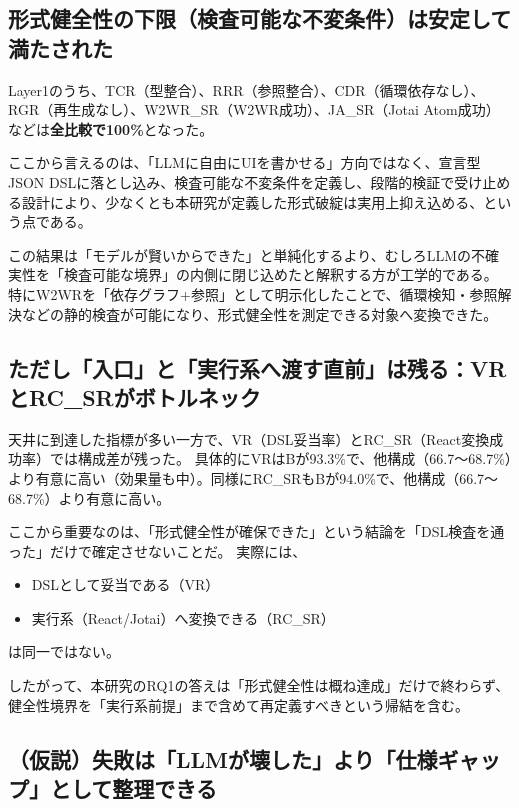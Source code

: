\documentclass[senior,final,11pt,dvipdfmx]{iputit-thesis}
\begin{document}
\subsection{形式健全性の下限（検査可能な不変条件）は安定して満たされた}
\label{subsec:disc_rq1_baseline}

Layer1のうち、TCR（型整合）、RRR（参照整合）、CDR（循環依存なし）、RGR（再生成なし）、W2WR\_SR（W2WR成功）、JA\_SR（Jotai Atom成功）などは\textbf{全比較で100\%}となった。

ここから言えるのは、「LLMに自由にUIを書かせる」方向ではなく、宣言型JSON DSLに落とし込み、検査可能な不変条件を定義し、段階的検証で受け止める設計により、少なくとも本研究が定義した形式破綻は実用上抑え込める、という点である。

この結果は「モデルが賢いからできた」と単純化するより、むしろLLMの不確実性を「検査可能な境界」の内側に閉じ込めたと解釈する方が工学的である。
特にW2WRを「依存グラフ+参照」として明示化したことで、循環検知・参照解決などの静的検査が可能になり、形式健全性を測定できる対象へ変換できた。

\subsection{ただし「入口」と「実行系へ渡す直前」は残る：VRとRC\_SRがボトルネック}
\label{subsec:disc_rq1_bottleneck}

天井に到達した指標が多い一方で、VR（DSL妥当率）とRC\_SR（React変換成功率）では構成差が残った。
具体的にVRはBが93.3\%で、他構成（66.7〜68.7\%）より有意に高い（効果量も中）。同様にRC\_SRもBが94.0\%で、他構成（66.7〜68.7\%）より有意に高い。

ここから重要なのは、「形式健全性が確保できた」という結論を「DSL検査を通った」だけで確定させないことだ。
実際には、
\begin{itemize}
\item[(A)] DSLとして妥当である（VR）
\item[(B)] 実行系（React/Jotai）へ変換できる（RC\_SR）
\end{itemize}
は同一ではない。

したがって、本研究のRQ1の答えは「形式健全性は概ね達成」だけで終わらず、健全性境界を「実行系前提」まで含めて再定義すべきという帰結を含む。

\subsection{（仮説）失敗は「LLMが壊した」より「仕様ギャップ」として整理できる}
\label{subsec:disc_rq1_hypothesis}
\end{document}

